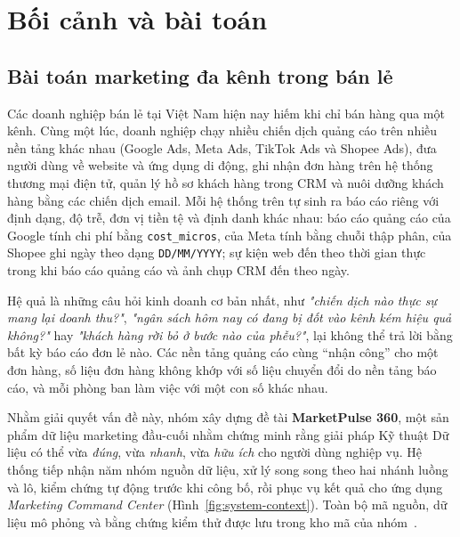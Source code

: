 \setcounter{page}{1}

\section{Bối cảnh và bài toán}
\label{sec:c1-boi-canh}

\subsection{Bài toán marketing đa kênh trong bán lẻ}
\label{sec:c1-bai-toan}

Các doanh nghiệp bán lẻ tại Việt Nam hiện nay hiếm khi chỉ bán hàng qua một kênh. Cùng một lúc, doanh nghiệp chạy nhiều chiến dịch quảng cáo trên nhiều nền tảng khác nhau (Google Ads, Meta Ads, TikTok Ads và Shopee Ads), đưa người dùng về website và ứng dụng di động, ghi nhận đơn hàng trên hệ thống thương mại điện tử, quản lý hồ sơ khách hàng trong CRM và nuôi dưỡng khách hàng bằng các chiến dịch email. Mỗi hệ thống trên tự sinh ra báo cáo riêng với định dạng, độ trễ, đơn vị tiền tệ và định danh khác nhau: báo cáo quảng cáo của Google tính chi phí bằng \texttt{cost\_micros}, của Meta tính bằng chuỗi thập phân, của Shopee ghi ngày theo dạng \texttt{DD/MM/YYYY}; sự kiện web đến theo thời gian thực trong khi báo cáo quảng cáo và ảnh chụp CRM đến theo ngày.

Hệ quả là những câu hỏi kinh doanh cơ bản nhất, như \emph{"chiến dịch nào thực sự mang lại doanh thu?"}, \emph{"ngân sách hôm nay có đang bị đốt vào kênh kém hiệu quả không?"} hay \emph{"khách hàng rời bỏ ở bước nào của phễu?"}, lại không thể trả lời bằng bất kỳ báo cáo đơn lẻ nào. Các nền tảng quảng cáo cùng ``nhận công'' cho một đơn hàng, số liệu đơn hàng không khớp với số liệu chuyển đổi do nền tảng báo cáo, và mỗi phòng ban làm việc với một con số khác nhau.

Nhằm giải quyết vấn đề này, nhóm xây dựng đề tài \textbf{MarketPulse 360}, một sản phẩm dữ liệu marketing đầu-cuối nhằm chứng minh rằng giải pháp Kỹ thuật Dữ liệu có thể vừa \emph{đúng}, vừa \emph{nhanh}, vừa \emph{hữu ích} cho người dùng nghiệp vụ. Hệ thống tiếp nhận năm nhóm nguồn dữ liệu, xử lý song song theo hai nhánh luồng và lô, kiểm chứng tự động trước khi công bố, rồi phục vụ kết quả cho ứng dụng \emph{Marketing Command Center} (Hình~\ref{fig:system-context}). Toàn bộ mã nguồn, dữ liệu mô phỏng và bằng chứng kiểm thử được lưu trong kho mã của nhóm~\cite{mp360repo}.

